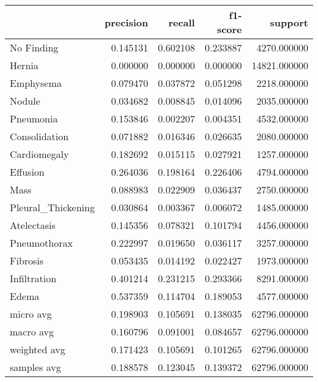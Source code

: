\begin{tabular}{lrrrr}
\toprule
 & precision & recall & f1-score & support \\
\midrule
No Finding & 0.145131 & 0.602108 & 0.233887 & 4270.000000 \\
Hernia & 0.000000 & 0.000000 & 0.000000 & 14821.000000 \\
Emphysema & 0.079470 & 0.037872 & 0.051298 & 2218.000000 \\
Nodule & 0.034682 & 0.008845 & 0.014096 & 2035.000000 \\
Pneumonia & 0.153846 & 0.002207 & 0.004351 & 4532.000000 \\
Consolidation & 0.071882 & 0.016346 & 0.026635 & 2080.000000 \\
Cardiomegaly & 0.182692 & 0.015115 & 0.027921 & 1257.000000 \\
Effusion & 0.264036 & 0.198164 & 0.226406 & 4794.000000 \\
Mass & 0.088983 & 0.022909 & 0.036437 & 2750.000000 \\
Pleural_Thickening & 0.030864 & 0.003367 & 0.006072 & 1485.000000 \\
Atelectasis & 0.145356 & 0.078321 & 0.101794 & 4456.000000 \\
Pneumothorax & 0.222997 & 0.019650 & 0.036117 & 3257.000000 \\
Fibrosis & 0.053435 & 0.014192 & 0.022427 & 1973.000000 \\
Infiltration & 0.401214 & 0.231215 & 0.293366 & 8291.000000 \\
Edema & 0.537359 & 0.114704 & 0.189053 & 4577.000000 \\
micro avg & 0.198903 & 0.105691 & 0.138035 & 62796.000000 \\
macro avg & 0.160796 & 0.091001 & 0.084657 & 62796.000000 \\
weighted avg & 0.171423 & 0.105691 & 0.101265 & 62796.000000 \\
samples avg & 0.188578 & 0.123045 & 0.139372 & 62796.000000 \\
\bottomrule
\end{tabular}

